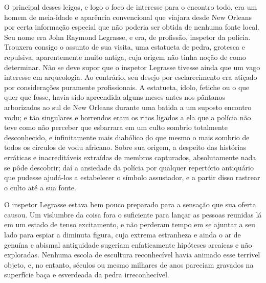 \begin{pages}
\begin{Rightside}
O principal desses leigos, e logo o foco de interesse para o encontro
todo, era um homem de meia-idade e aparência convencional que viajara
desde New Orleans por certa informação especial que não poderia ser
obtida de nenhuma fonte local. Seu nome era John Raymond Legrasse, e
era, de profissão, inspetor da polícia. Trouxera consigo o assunto de
sua visita, uma estatueta de pedra, grotesca e repulsiva, aparentemente
muito antiga, cuja origem não tinha noção de como determinar. Não se
deve supor que o inspetor Legrasse tivesse ainda que um vago interesse
em arqueologia. Ao contrário, seu desejo por esclarecimento era atiçado
por considerações puramente profissionais. A estatueta, ídolo, fetiche
ou o que quer que fosse, havia sido apreendida alguns meses antes nos
pântanos arborizados ao sul de New Orleans durante uma batida a um
suposto encontro vodu; e tão singulares e horrendos eram os ritos
ligados a ela que a polícia não teve como não perceber que esbarrara em
um culto sombrio totalmente desconhecido, e infinitamente mais diabólico
do que mesmo o mais sombrio de todos os círculos de vodu africano. Sobre
sua origem, a despeito das histórias erráticas e inacreditáveis
extraídas de membros capturados, absolutamente nada se pôde descobrir;
daí a ansiedade da polícia por qualquer repertório antiquário que
pudesse ajudá-los a estabelecer o símbolo assustador, e a partir disso
rastrear o culto até a sua fonte.

O inspetor Legrasse estava bem pouco preparado para a sensação que sua
oferta causou. Um vislumbre da coisa fora o suficiente para lançar as
pessoas reunidas lá em um estado de tenso excitamento, e não perderam
tempo em se ajuntar a seu lado para espiar a diminuta figura, cuja
extrema estranheza e ainda o ar de genuína e abismal antiguidade
sugeriam enfaticamente hipóteses arcaicas e não exploradas. Nenhuma
escola de escultura reconhecível havia animado esse terrível objeto, e,
no entanto, séculos ou mesmo milhares de anos pareciam gravados na
superfície baça e esverdeada da pedra irreconhecível.


\end{Rightside}
\end{pages}
